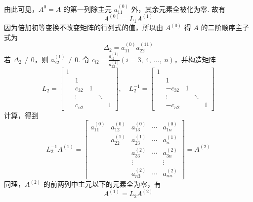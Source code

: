             由此可见，$A^{0} = A$ 的第一列除主元 $a_{11}^{(0)}$ 外，其余元素全被化为零. 故有
            \begin{equation*}
                A^{(0)} = L_1A^{(1)}
            \end{equation*}
            因为倍加初等变换不改变矩阵的行列式的值，所以由 $A^{(0)}$ 得 $A$ 的二阶顺序主子式为
            \begin{equation*}
                \Delta_2 = a_{11}^{(0)}a_{22}^{(11)}
            \end{equation*}
            若 $\Delta_2 \ne 0$，则 $a_{22}^{(1)} \ne 0$. 令 $c_{i2} = \frac{a_{i2}^{(1)}}{a_{22}^{(1)}}(i = 3, \ 4, \ \dots, \ n)$，并构造矩阵
            \begin{equation*}
                L_2 = \begin{bmatrix}
                    1 & & & & \\ & 1 & & & \\ & c_{32} & 1 & & \\ & \vdots & & \ddots & \\ & c_{n2} & & & 1
                \end{bmatrix}, \quad L_2^{-1} = \begin{bmatrix}
                    1 & & & & \\ & 1 & & & \\ & -c_{32} & 1 & & \\ & \vdots & & \ddots & \\ & -c_{n2} & & & 1
                \end{bmatrix}
            \end{equation*}
            计算，得到
            \begin{equation*}
                L_2^{-1}A^{(1)} = \begin{bmatrix}
                    a_{11}^{(0)} & a_{12}^{(0)} & a_{13}^{(0)} & \cdots & a_{1n}^{(0)} \\ & a_{22}^{(1)} & a_{23}^{(1)} & \cdots & a_{n}^{(1)} \\ & & a_{33}^{(2)} & \cdots & a_{3n}^{(2)} \\ & & \vdots & & \vdots \\ & & a_{n3}^{(2)} & \cdots & a_{nn}^{(2)}
                \end{bmatrix} = A^{(2)}
            \end{equation*}
            同理，$A^{(2)}$ 的前两列中主元以下的元素全为零，有
            \begin{equation*}
                A^{(1)} = L_2A^{(2)}
            \end{equation*}
